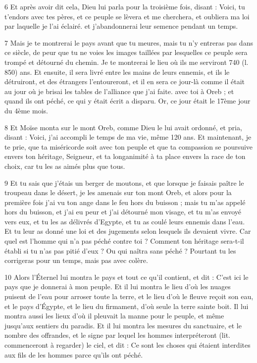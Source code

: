 \par 6 Et après avoir dit cela, Dieu lui parla pour la troisième fois, disant : Voici, tu t'endors avec tes pères, et ce peuple se lèvera et me cherchera, et oubliera ma loi par laquelle je l'ai éclairé. et j'abandonnerai leur semence pendant un temps.

\par 7 Mais je te montrerai le pays avant que tu meures, mais tu n'y entreras pas dans ce siècle, de peur que tu ne voies les images taillées par lesquelles ce peuple sera trompé et détourné du chemin. Je te montrerai le lieu où ils me serviront 740 (l. 850) ans. Et ensuite, il sera livré entre les mains de leurs ennemis, et ils le détruiront, et des étrangers l'entoureront, et il en sera ce jour-là comme il était au jour où je brisai les tables de l'alliance que j'ai faite. avec toi à Oreb ; et quand ils ont péché, ce qui y était écrit a disparu. Or, ce jour était le 17ème jour du 4ème mois.

\par 8 Et Moïse monta sur le mont Oreb, comme Dieu le lui avait ordonné, et pria, disant : Voici, j'ai accompli le temps de ma vie, même 120 ans. Et maintenant, je te prie, que ta miséricorde soit avec ton peuple et que ta compassion se poursuive envers ton héritage, Seigneur, et ta longanimité à ta place envers la race de ton choix, car tu les as aimés plus que tous.

\par 9 Et tu sais que j'étais un berger de moutons, et que lorsque je faisais paître le troupeau dans le désert, je les amenais sur ton mont Oreb, et alors pour la première fois j'ai vu ton ange dans le feu hors du buisson ; mais tu m'as appelé hors du buisson, et j'ai eu peur et j'ai détourné mon visage, et tu m'as envoyé vers eux, et tu les as délivrés d'Egypte, et tu as coulé leurs ennemis dans l'eau. Et tu leur as donné une loi et des jugements selon lesquels ils devaient vivre. Car quel est l'homme qui n'a pas péché contre toi ? Comment ton héritage sera-t-il établi si tu n’as pas pitié d’eux ? Ou qui naîtra sans péché ? Pourtant tu les corrigeras pour un temps, mais pas avec colère.

\par 10 Alors l'Éternel lui montra le pays et tout ce qu'il contient, et dit : C'est ici le pays que je donnerai à mon peuple. Et il lui montra le lieu d'où les nuages ​​puisent de l'eau pour arroser toute la terre, et le lieu d'où le fleuve reçoit son eau, et le pays d'Égypte, et le lieu du firmament, d'où seule la terre sainte boit. Il lui montra aussi les lieux d'où il pleuvait la manne pour le peuple, et même jusqu'aux sentiers du paradis. Et il lui montra les mesures du sanctuaire, et le nombre des offrandes, et le signe par lequel les hommes interpréteront (lit. commenceront à regarder) le ciel, et dit : Ce sont les choses qui étaient interdites aux fils de les hommes parce qu'ils ont péché.

